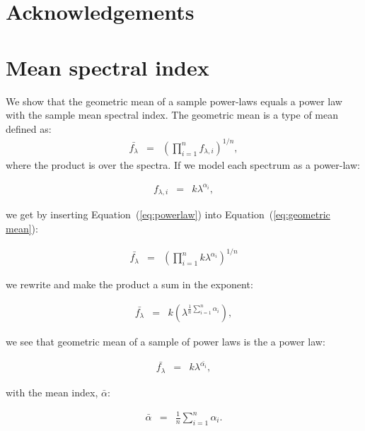 \documentclass{aa}    %
\newcommand{\Eq}[1]{Equation~(\ref{eq:#1})}
\newcommand{\eq}[1]{\Eq{#1}}
\newcommand{\eqlabel}[1]{\label{eq:#1}}
\newcommand{\sectlabel}[1]{\label{sect:#1}}
\begin{document}
\section{Acknowledgements}  \sectlabel{Acknowledgements}







 





\appendix

\section{Mean spectral index}  \sectlabel{math}


We show that the geometric mean of a sample power-laws equals a power law with the sample mean spectral index. The geometric mean is a type of mean defined as:
\begin{eqnarray}\eqlabel{geometric mean}
\bar{f_{\lambda}} &=&  \left( \prod_{i=1}^n f_{\lambda, i} \right) ^{1/n},
\end{eqnarray}
where the product is over the spectra. If we model each spectrum as a power-law:

\begin{eqnarray}\eqlabel{powerlaw}
f_{\lambda, i} &=&  k \lambda ^{\alpha_{i}},
\end{eqnarray}

 we get by inserting \eq{powerlaw} into \eq{geometric mean}:
 
 \begin{eqnarray}\eqlabel{deriv1}
 \bar{f_{\lambda}} &=&  \left( \prod_{i=1}^n k \lambda ^{\alpha_{i}}\right) ^{1/n}
 \end{eqnarray}

we rewrite and make the product a sum in the exponent:

 \begin{eqnarray}\eqlabel{deriv2}
 \bar{f_{\lambda}} &=&  k \left( \lambda ^{ \frac{1}{n} \sum_{i=1}^n \alpha_{i}  }\right) ,
 \end{eqnarray}

we see that geometric mean of a sample of power laws is the a power law:

 \begin{eqnarray}\eqlabel{deriv3}
 \bar{f_{\lambda}} &=&  k \lambda ^{ \bar{\alpha_{i} }},
 \end{eqnarray}

with the mean index, $\bar{\alpha}$:

 \begin{eqnarray}\eqlabel{mean}
 \bar{\alpha} &=&  \frac{1}{n} \sum_{i=1}^n \alpha_{i} .
 \end{eqnarray}
\end{document}
